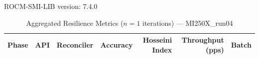 ROCM-SMI-LIB version: 7.4.0

\begin{table}[htbp]
\caption{Aggregated Resilience Metrics ($n=1$ iterations) --- MI250X_run04}
\begin{tabular}{l l l r r r r}
\hline
Phase & API & Reconciler & Accuracy & Hosseini Index & Throughput (pps) & Batch \\
\hline
\hline
\end{tabular}
\end{table}
